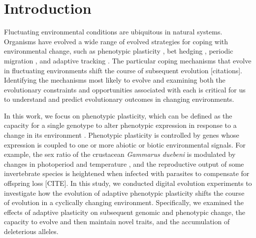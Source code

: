 
\section{Introduction}

Fluctuating environmental conditions are ubiquitous in natural systems. 
Organisms have evolved a wide range of evolved strategies for coping with environmental change, such as 
phenotypic plasticity \citep{ghalambor_adaptive_2007}, 
bet hedging \citep{beaumont_experimental_2009}, 
periodic migration \citep{winger_long_2019}, 
and adaptive tracking \citep{barrett_adaptation_2008}.
The particular coping mechanisms that evolve in fluctuating environments shift the course of subsequent evolution [citations].
Identifying the mechanisms most likely to evolve and examining both the evolutionary constraints and opportunities associated with each is critical for us to understand and predict evolutionary outcomes in changing environments.

In this work, we focus on phenotypic plasticity, which can be defined as the capacity for a single genotype to alter phenotypic expression in response to a change in its environment \citep{west-eberhard_developmental_2003}. 
Phenotypic plasticity is controlled by genes whose expression is coupled to one or more abiotic or biotic environmental signals. 
For example, the sex ratio of the crustacean \textit{Gammarus duebeni} is modulated by changes in photoperiod and temperature \citep{dunn_two_2005}, and the reproductive output of some invertebrate species is heightened when infected with parasites to compensate for offspring loss [CITE]. 
In this study, we conducted digital evolution experiments to investigate how the evolution of adaptive phenotypic plasticity shifts the course of evolution in a cyclically changing environment.
Specifically, we examined the effects of adaptive plasticity on subsequent genomic and phenotypic change, the capacity to evolve and then maintain novel traits, and the accumulation of deleterious alleles.


